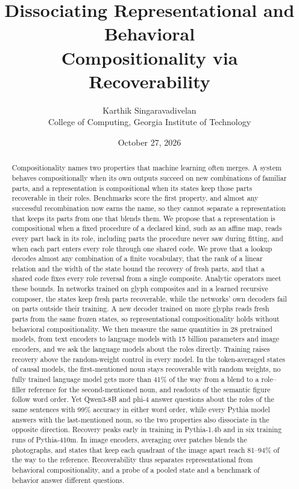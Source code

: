 \documentclass[10pt]{article}
\title{Dissociating Representational and Behavioral\\ Compositionality via Recoverability}
\author{Karthik Singaravadivelan\\ College of Computing, Georgia Institute of Technology}
\date{October 27, 2026}
\theoremstyle{plain}
\theoremstyle{remark}
\begin{document}
\maketitle

\begin{abstract}
Compositionality names two properties that machine learning often merges. A system behaves compositionally when its own outputs succeed on new combinations of familiar parts, and a representation is compositional when its states keep those parts recoverable in their roles. Benchmarks score the first property, and almost any successful recombination now earns the name, so they cannot separate a representation that keeps its parts from one that blends them. We propose that a representation is compositional when a fixed procedure of a declared kind, such as an affine map, reads every part back in its role, including parts the procedure never saw during fitting, and when each part enters every role through one shared code. We prove that a lookup decodes almost any combination of a finite vocabulary, that the rank of a linear relation and the width of the state bound the recovery of fresh parts, and that a shared code fixes every role reversal from a single composite. Analytic operators meet these bounds. In networks trained on glyph composites and in a learned recursive composer, the states keep fresh parts recoverable, while the networks' own decoders fail on parts outside their training. A new decoder trained on more glyphs reads fresh parts from the same frozen states, so representational compositionality holds without behavioral compositionality. We then measure the same quantities in 28 pretrained models, from text encoders to language models with 15 billion parameters and image encoders, and we ask the language models about the roles directly. Training raises recovery above the random-weight control in every model. In the token-averaged states of causal models, the first-mentioned noun stays recoverable with random weights, no fully trained language model gets more than 41\% of the way from a blend to a role--filler reference for the second-mentioned noun, and readouts of the semantic figure follow word order. Yet Qwen3-8B and phi-4 answer questions about the roles of the same sentences with 99\% accuracy in either word order, while every Pythia model answers with the last-mentioned noun, so the two properties also dissociate in the opposite direction. Recovery peaks early in training in Pythia-1.4b and in six training runs of Pythia-410m. In image encoders, averaging over patches blends the photographs, and states that keep each quadrant of the image apart reach 81--94\% of the way to the reference. Recoverability thus separates representational from behavioral compositionality, and a probe of a pooled state and a benchmark of behavior answer different questions.
\end{abstract}
\end{document}
